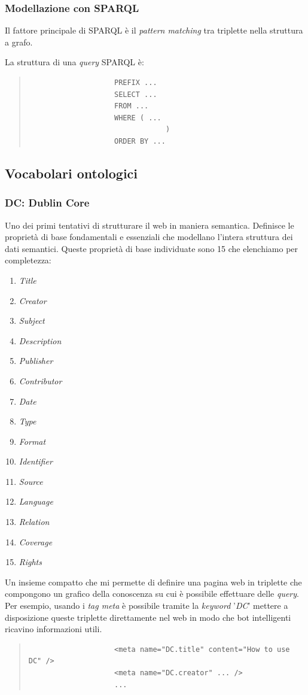 			\subsubsection{Modellazione con SPARQL}		
				Il fattore principale di SPARQL è il \emph{pattern matching} tra triplette nella struttura a grafo. 
				
				La struttura di una \emph{query} SPARQL è:
				\begin{quote}
				\begin{verbatim}
					PREFIX ...
					SELECT ...
					FROM ...
					WHERE ( ...
								)
					ORDER BY ...					
				\end{verbatim}					
				\end{quote}					
				
		\subsection{Vocabolari ontologici}
		
				\subsubsection{DC: Dublin Core}
					Uno dei primi tentativi di strutturare il web in maniera semantica. Definisce le proprietà di base fondamentali e essenziali che modellano l'intera struttura dei dati semantici. Queste proprietà di base individuate sono 15 che elenchiamo per completezza:
					\begin{enumerate}
						\item \emph{Title}
						\item \emph{Creator}
						\item \emph{Subject}
						\item \emph{Description}
						\item \emph{Publisher}
						\item \emph{Contributor}
						\item \emph{Date}
						\item \emph{Type}
						\item \emph{Format}
						\item \emph{Identifier}
						\item \emph{Source}
						\item \emph{Language}
						\item \emph{Relation}
						\item \emph{Coverage}
						\item \emph{Rights}
					\end{enumerate}
				Un insieme compatto che mi permette di definire una pagina web in triplette che compongono un grafico della conoscenza su cui è possibile effettuare delle \emph{query}.
				Per esempio, usando i \emph{tag meta} è possibile tramite la \emph{keyword} '\emph{DC}' mettere a disposizione queste triplette direttamente nel web in modo che bot intelligenti ricavino informazioni utili.
				\begin{quote}
				\begin{verbatim}
					<meta name="DC.title" content="How to use DC" />
					<meta name="DC.creator" ... />
					...
				\end{verbatim}
				\end{quote}
				
